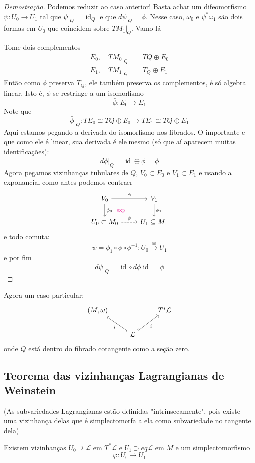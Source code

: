 \begin{proof}[Demostra\c c\~ao]
	Podemos reduzir ao caso anterior! Basta achar um difeomorfismo $\psi:U_0\to U_1$ tal que $\psi|_{Q}=\operatorname{id}_Q$ e que $d\psi|_{Q}=\phi$. Nesse caso, $\omega_0$ e $\psi^*\omega_1$ s\~ao dois formas em $U_0$ que coincidem sobre $TM_1|_{Q}$. Vamo l\'a

	Tome dois complementos
	 \begin{align*}
		E_0,\quad TM_0|_{Q}&=TQ\oplus E_0\\
		E_1,\quad TM_1|_{Q}&=T_Q\oplus E_1
	\end{align*}
	Ent\~ao como $\phi$ preserva $T_Q$, ele tamb\'em preserva os complementos, \'e s\'o algebra linear. Isto \'e, $\phi$ se restringe a um isomorfismo
	\[\bar{\phi} :E_0\to E_1\]
	Note que
	\[ \bar{\phi}|_{Q} :TE_0\cong TQ\oplus E_0\to TE_1\cong TQ\oplus E_1\]
	Aqui estamos pegando a derivada do isomorfismo nos fibrados. O importante e que como ele \'e linear, sua derivada \'e ele mesmo (s\'o que a\'i aparecem muitas identifica\c c\~oes):
	\[d\bar{\phi}|_{Q}=\operatorname{id}\oplus \bar{\phi} =\phi\]
Agora pegamos vizinhanças tubulares de $Q$, $V_0\subset E_0$ e $V_1\subset E_1$ e usando a exponancial como antes podemos contraer
\[\begin{tikzcd}
	V_0\arrow[r,"\phi"]\arrow[d,"\phi_0{\color{magenta}= \operatorname{exp}}"]&V_1\arrow[d,"\phi_1"]\\
	U_0\subset M_0\arrow[r,"\psi",dashed]&U_1\subseteq M_1
\end{tikzcd}\]
e todo comuta:
\[\psi=\phi_1\circ \bar{\phi} \circ \phi^{-1}:U_0\overset{\cong }{\longrightarrow} U_1\]
e por fim
\[d\psi|_{Q}=\operatorname{id}\circ d \bar{\phi} \operatorname{id}=\phi\]
\end{proof}

Agora um caso particular:
\[\begin{tikzcd}
	(M,\omega)&&T^*\mathcal{L}\\
&\mathcal{L}\arrow[ul,hook,"i"]\arrow[ur,"i",swap,hook]
\end{tikzcd}\]
onde $Q$ est\'a dentro do fibrado cotangente como a se\c c\~ao zero.

\subsection{Teorema das vizinhanças Lagrangianas de Weinstein}


\begin{thm}\leavevmode
	(As subvariedades Lagrangianas est\~ao definidas "intrinsecamente", pois existe uma vizinhança delas que \'e simplectomorfa a ela como subvariedade no tangente dela)

	Existem vizinhanças $U_0\supseteq \mathcal{L}$ em $T^*\mathcal{L}$ e $U_1\supset eq \mathcal{L}$ em $M$ e um simplectomorfismo
	\[\varphi:U_0\to U_1\]
\end{thm}

